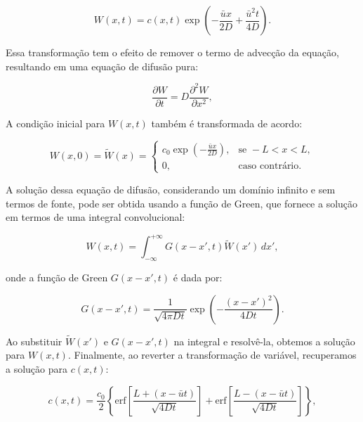 \begin{equation}
    W(x, t) = c(x, t) \exp\left( -\frac{\bar{u} x}{2D} + \frac{\bar{u}^2 t}{4D} \right).
\end{equation}

Essa transformação tem o efeito de remover o termo de advecção da equação, resultando em uma equação de difusão pura:

\begin{equation}
    \frac{\partial W}{\partial t} = D \frac{\partial^2 W}{\partial x^2},
\end{equation}

A condição inicial para \( W(x, t) \) também é transformada de acordo:

\begin{equation}
    W(x, 0) = \tilde{W}(x) = \begin{cases}
        c_0 \exp\left( -\frac{\bar{u} x}{2D} \right), & \text{se } -L < x < L, \\
        0,                                            & \text{caso contrário}.
    \end{cases}
\end{equation}

A solução dessa equação de difusão, considerando um domínio infinito e sem termos de fonte, pode ser obtida usando a função de Green, que fornece a solução em termos de uma integral convolucional:

\begin{equation}
    W(x, t) = \int_{-\infty}^{+\infty} G(x - x', t) \tilde{W}(x') \, dx',
\end{equation}

onde a função de Green \( G(x - x', t) \) é dada por:

\begin{equation}
    G(x - x', t) = \frac{1}{\sqrt{4\pi D t}} \exp\left( -\frac{(x - x')^2}{4Dt} \right).
\end{equation}

Ao substituir \( \tilde{W}(x') \) e \( G(x - x', t) \) na integral e resolvê-la, obtemos a solução para \( W(x, t) \). Finalmente, ao reverter a transformação de variável, recuperamos a solução para \( c(x, t) \):

\begin{equation}
    c(x, t) = \frac{c_0}{2} \left\{ \text{erf} \left[ \frac{L + (x - \bar{u}t)}{\sqrt{4Dt}} \right] + \text{erf} \left[ \frac{L - (x - \bar{u}t)}{\sqrt{4Dt}} \right] \right\},
\end{equation}

